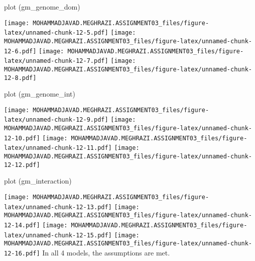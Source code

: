 \documentclass[
]{article}
\newenvironment{Shaded}{\begin{snugshade}}{\end{snugshade}}
\newcommand{\FunctionTok}[1]{\textcolor[rgb]{0.00,0.00,0.00}{#1}}
\newcommand{\NormalTok}[1]{#1}
\begin{document}
\begin{Shaded}
\begin{Highlighting}[]
\FunctionTok{plot}\NormalTok{ (gm\_genome\_dom)}
\end{Highlighting}
\end{Shaded}

\texttt{[image: MOHAMMADJAVAD.MEGHRAZI.ASSIGNMENT03\_files/figure-latex/unnamed-chunk-12-5.pdf]}
\texttt{[image: MOHAMMADJAVAD.MEGHRAZI.ASSIGNMENT03\_files/figure-latex/unnamed-chunk-12-6.pdf]}
\texttt{[image: MOHAMMADJAVAD.MEGHRAZI.ASSIGNMENT03\_files/figure-latex/unnamed-chunk-12-7.pdf]}
\texttt{[image: MOHAMMADJAVAD.MEGHRAZI.ASSIGNMENT03\_files/figure-latex/unnamed-chunk-12-8.pdf]}

\begin{Shaded}
\begin{Highlighting}[]
\FunctionTok{plot}\NormalTok{ (gm\_genome\_int)}
\end{Highlighting}
\end{Shaded}

\texttt{[image: MOHAMMADJAVAD.MEGHRAZI.ASSIGNMENT03\_files/figure-latex/unnamed-chunk-12-9.pdf]}
\texttt{[image: MOHAMMADJAVAD.MEGHRAZI.ASSIGNMENT03\_files/figure-latex/unnamed-chunk-12-10.pdf]}
\texttt{[image: MOHAMMADJAVAD.MEGHRAZI.ASSIGNMENT03\_files/figure-latex/unnamed-chunk-12-11.pdf]}
\texttt{[image: MOHAMMADJAVAD.MEGHRAZI.ASSIGNMENT03\_files/figure-latex/unnamed-chunk-12-12.pdf]}

\begin{Shaded}
\begin{Highlighting}[]
\FunctionTok{plot}\NormalTok{ (gm\_interaction)}
\end{Highlighting}
\end{Shaded}

\texttt{[image: MOHAMMADJAVAD.MEGHRAZI.ASSIGNMENT03\_files/figure-latex/unnamed-chunk-12-13.pdf]}
\texttt{[image: MOHAMMADJAVAD.MEGHRAZI.ASSIGNMENT03\_files/figure-latex/unnamed-chunk-12-14.pdf]}
\texttt{[image: MOHAMMADJAVAD.MEGHRAZI.ASSIGNMENT03\_files/figure-latex/unnamed-chunk-12-15.pdf]}
\texttt{[image: MOHAMMADJAVAD.MEGHRAZI.ASSIGNMENT03\_files/figure-latex/unnamed-chunk-12-16.pdf]}
In all 4 models, the assumptions are met.
\end{document}
